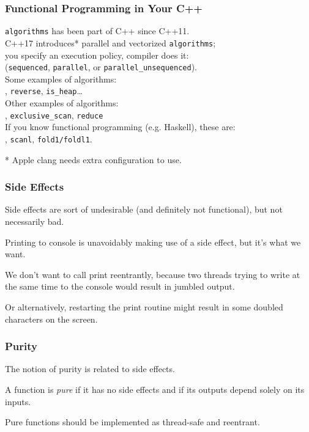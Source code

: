 \begin{frame}
\frametitle{Functional Programming in Your C++}

{\tt algorithms} has been part of C++ since C++11.\\

C++17 introduces* parallel and vectorized {\tt algorithms};\\
\qquad you specify an execution policy, compiler does it:\\
\qquad ({\tt sequenced}, {\tt parallel},
or {\tt parallel\_unsequenced}).\\[1em]

Some examples of algorithms:\\
, {\tt reverse}, {\tt is\_heap}\ldots\\[1em]

Other examples of algorithms:\\
, {\tt exclusive\_scan}, {\tt reduce}\\[1em]
If you know functional programming (e.g. Haskell), these are:\\
, {\tt scanl}, {\tt fold1/foldl1}.

* Apple clang needs extra configuration to use.

\end{frame}

\begin{frame}
\frametitle{Side Effects}

Side effects are sort of undesirable (and definitely not functional), but not necessarily bad. 

Printing to console is unavoidably making use of a side effect, but it's what we want. 

We don't want to call print reentrantly, because two threads trying to write at the same time to the console would result in jumbled output. 

Or alternatively, restarting the print routine might result in some doubled characters on the screen.

\end{frame}

\begin{frame}
\frametitle{Purity}

The notion of purity is related to side effects.

A function is \emph{pure} if it has no side effects and if its outputs depend solely on its inputs.

Pure functions should be implemented as thread-safe and reentrant.

\end{frame}

